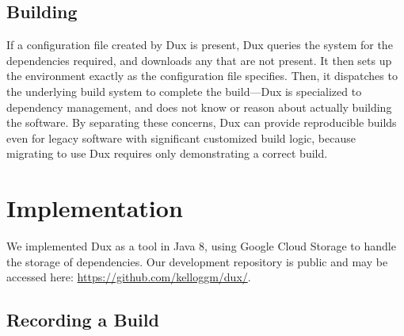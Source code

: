 \documentclass[10pt,conference]{IEEEtran}
\begin{document}
\subsection{Building}

If a configuration file created by Dux is present, Dux queries the system for the dependencies required,
and downloads any that are not present.
It then sets up the environment exactly as the configuration file specifies.
Then, it dispatches to the underlying build system to complete the build---Dux is specialized
to dependency management, and does not know or reason about actually building the software.
By separating these concerns, Dux can provide reproducible builds even for legacy software
with significant customized build logic, because migrating to use Dux requires only
demonstrating a correct build.

\section{Implementation}

We implemented Dux as a tool in Java 8, using Google Cloud Storage to handle the storage of dependencies.
Our development repository is public and may be accessed here: \url{https://github.com/kelloggm/dux/}.

\subsection{Recording a Build}
\end{document}
